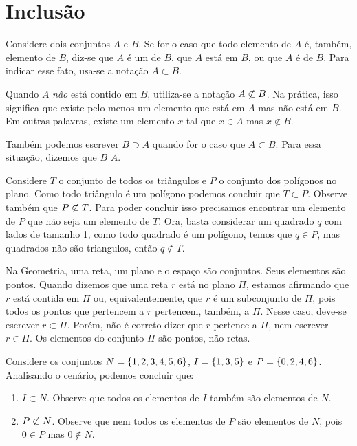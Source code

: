 \section{Inclusão}

\begin{definition}
\label{def:subset}
Considere dois conjuntos $A$ e $B$.
Se for o caso que todo elemento de $A$ é, também, elemento de $B$, diz-se que $A$ é um  de $B$, que $A$ está  em $B$, ou que $A$ é  de $B$.
Para indicar esse fato, usa-se a notação $A \subset B$.

\label{def:notsubset}
Quando $A$ \textit{não} está contido em $B$,  utiliza-se a notação  $A \not\subset B$.
Na prática, isso significa que existe pelo menos um elemento que está em $A$ mas não está em $B$.
Em outras palavras, existe um elemento $x$ tal que $x \in A$ mas $x \notin B$.
\end{definition}

\begin{remark}
Também podemos escrever $B \supset A$ quando for o caso que $A \subset B$. Para essa situação, dizemos que $B$  $A$.
\end{remark}

\begin{example}
Considere $T$ o conjunto de todos os triângulos e $P$ o conjunto dos polígonos no plano. Como todo triângulo é um polígono podemos concluir que $T \subset P$.
Observe também que $P \not\subset T$. Para poder concluir isso precisamos encontrar um elemento de $P$ que não seja um elemento de $T$. Ora, basta considerar um quadrado $q$ com lados de tamanho 1, como todo quadrado é um polígono, temos que $q \in P$, mas quadrados não são triangulos, então $q \notin T$.
\end{example}

\begin{example}
Na Geometria, uma reta, um plano e o espaço são conjuntos. Seus
elementos são pontos. Quando dizemos que uma reta $r$ está no plano $\Pi$, estamos afirmando que $r$ está contida em $\Pi$ ou, equivalentemente, que $r$ é um subconjunto de $\Pi$, pois todos os pontos que pertencem a $r$ pertencem, também, a $\Pi$. Nesse caso, deve-se escrever $ r \subset \Pi$. Porém, não é correto dizer que $r$ pertence a $\Pi$, nem escrever $r \in \Pi$. Os
elementos do conjunto $\Pi$ são pontos, não retas.
\end{example}

\begin{example}
Considere os conjuntos $N = \left\{ 1, 2, 3, 4, 5, 6\right\}$, $I = \left\{ 1, 3, 5\right\}$ e $P = \left\{ 0, 2, 4, 6\right\}$.
Analisando o cenário, podemos concluir que:
\begin{enumerate}
\item
$I \subset N$. Observe que todos os elementos de $I$ também são elementos de $N$.
\item
$P \not\subset N$. Observe que nem todos os elementos de $P$ são elementos de $N$, pois $0 \in P$ mas $0 \notin N$.
\end{enumerate}
\end{example}

